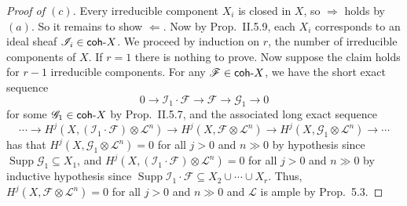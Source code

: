 \documentclass[10pt]{article}
\theoremstyle{definition}
\theoremstyle{remark}
\numberwithin{equation}{section}
\numberwithin{figure}{subsubsection}
\DeclareMathOperator{\Supp}{Supp}
\newcommand{\FF}{\mathscr{F}}
\newcommand{\GG}{\mathscr{G}}
\newcommand{\II}{\mathscr{I}}
\newcommand{\LL}{\mathscr{L}}
\newcommand{\coh}{\mathsf{coh}\mathchar`-}
\begin{document}
\begin{proof}[Proof of $(c)$]
  Every irreducible component $X_i$ is closed in $X$, so $\Rightarrow$ holds by
  $(a)$. So it remains to show $\Leftarrow$.
  Now by Prop.\ II.5.9, each $X_i$ corresponds to an ideal sheaf $\II_i
  \in \coh X$. We proceed by induction on $r$, the number of irreducible
  components of $X$. If $r=1$ there is nothing to prove. Now suppose the claim
  holds for $r-1$ irreducible components. For any $\FF \in \coh X$, we have the
  short exact sequence
  \begin{equation*}
    0 \longrightarrow \II_1 \cdot \FF \longrightarrow \FF \longrightarrow
    \GG_1 \longrightarrow 0
  \end{equation*}
  for some $\GG_1 \in \coh X$ by Prop.\ II.5.7, and the associated long exact
  sequence
  \begin{equation*}
    \cdots \longrightarrow H^j(X,(\II_1 \cdot \FF) \otimes \LL^n)
    \longrightarrow
    H^j(X,\FF \otimes \LL^n)
    \longrightarrow H^j(X,\mathscr{G}_1 \otimes \LL^n)
    \longrightarrow \cdots
  \end{equation*}
  has that $H^j(X,\mathscr{G}_1 \otimes \LL^n) = 0$ for all $j > 0$ and $n \gg
  0$ by hypothesis since $\Supp \GG_1 \subseteq X_1$, and $H^j(X,(\II_1 \cdot
  \FF) \otimes \LL^n) = 0$ for all $j > 0$ and $n \gg 0$ by inductive
  hypothesis since $\Supp \II_1 \cdot \FF \subseteq X_2 \cup \cdots \cup X_r$.
  Thus, $H^j(X,\FF \otimes \LL^n) = 0$ for all $j > 0$ and $n \gg 0$ and $\LL$
  is ample by Prop.\ 5.3.
\end{proof}
\end{document}

